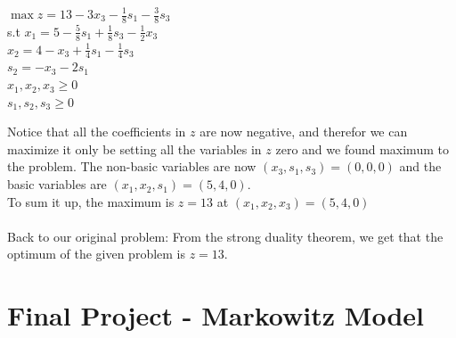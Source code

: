 \documentclass{article}
\begin{document}
\begin{center}
    $\max z = 13 -3x_3 -\frac{1}{8}s_1 -\frac{3}{8}s_3$\\
    s.t $x_1 = 5 -\frac{5}{8}s_1 +\frac{1}{8}s_3 -\frac{1}{2}x_3$\\
    $x_2 = 4 - x_3 +\frac{1}{4}s_1 -\frac{1}{4}s_3$\\
    $s_2 = -x_3 -2s_1$\\
    $x_1, x_2, x_3 \ge 0$\\
    $s_1, s_2, s_3 \ge 0$
\end{center}
Notice that all the coefficients in $z$ are now negative, and therefor we can maximize it only be setting all the variables in $z$ zero and we found maximum to the problem. The non-basic variables are now $(x_3, s_1, s_3) = (0, 0, 0)$ and the basic variables are $(x_1, x_2, s_1) = (5, 4, 0)$.\\
To sum it up, the maximum is $z=13$ at $(x_1, x_2, x_3) = (5, 4, 0)$
\\ \\
Back to our original problem: From the strong duality theorem, we get that the optimum of the given problem is $z=13$.\\
\newpage
\section{Final Project - Markowitz Model}
\end{document}

